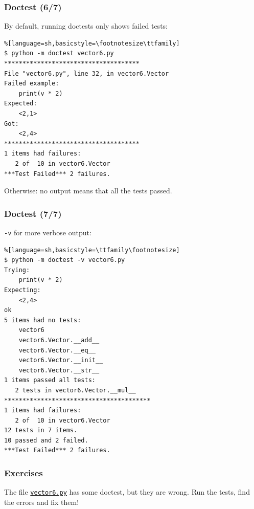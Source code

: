 \begin{frame}[fragile]\frametitle{Doctest (6/7)}

  By default, running doctests only shows failed tests:
\begin{lstlisting}%[language=sh,basicstyle=\footnotesize\ttfamily]
$ python -m doctest vector6.py
*************************************
File "vector6.py", line 32, in vector6.Vector
Failed example:
    print(v * 2)
Expected:
    <2,1>
Got:
    <2,4>
*************************************
1 items had failures:
   2 of  10 in vector6.Vector
***Test Failed*** 2 failures.
\end{lstlisting}
  Otherwise: no output means that all the tests passed.
\end{frame}

\begin{frame}[fragile]\frametitle{Doctest (7/7)}

\texttt{-v} for more verbose output:
\begin{lstlisting}%[language=sh,basicstyle=\ttfamily\footnotesize]
$ python -m doctest -v vector6.py
Trying:
    print(v * 2)
Expecting:
    <2,4>
ok
5 items had no tests:
    vector6
    vector6.Vector.__add__
    vector6.Vector.__eq__
    vector6.Vector.__init__
    vector6.Vector.__str__
1 items passed all tests:
   2 tests in vector6.Vector.__mul__
****************************************
1 items had failures:
   2 of  10 in vector6.Vector
12 tests in 7 items.
10 passed and 2 failed.
***Test Failed*** 2 failures.
\end{lstlisting}
\end{frame}

\begin{frame}[fragile]\frametitle{Exercises}
  The file
  \href{https://raw.github.com/gc3-uzh-ch/python-course/master/vector6.py}{\texttt{vector6.py}}
  has some doctest, but they are wrong. Run the tests, find the errors
  and fix them!

\end{frame}

